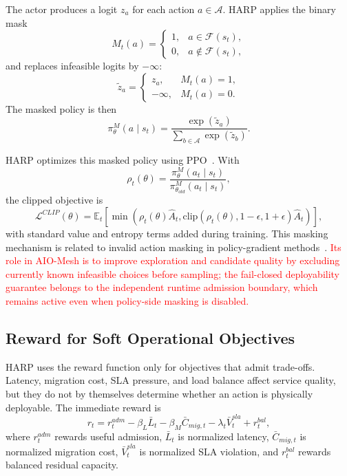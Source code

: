 \documentclass[final,5p]{elsarticle}
\newcommand{\rev}[1]{\textcolor{red}{#1}}
\begin{document}
The actor produces a logit \(z_a\) for each action \(a\in\mathcal{A}\). HARP applies the binary mask
\begin{equation}
    M_t(a)=
    \begin{cases}
        1, & a\in\mathcal{F}(s_t),\\
        0, & a\notin\mathcal{F}(s_t),
    \end{cases}
\end{equation}
and replaces infeasible logits by \(-\infty\):
\begin{equation}
    \tilde{z}_a=
    \begin{cases}
        z_a, & M_t(a)=1,\\
        -\infty, & M_t(a)=0.
    \end{cases}
\end{equation}
The masked policy is then
\begin{equation}
    \pi_\theta^{M}(a\mid s_t)
    =
    \frac{\exp(\tilde{z}_a)}
    {\sum_{b\in\mathcal{A}}\exp(\tilde{z}_b)}.
\end{equation}

HARP optimizes this masked policy using PPO~\cite{schulman2017proximal}. With
\begin{equation}
    \rho_t(\theta)=
    \frac{\pi_\theta^{M}(a_t\mid s_t)}
    {\pi_{\theta_{old}}^{M}(a_t\mid s_t)},
\end{equation}
the clipped objective is
\begin{equation}
    \mathcal{L}^{CLIP}(\theta)
    =
    \mathbb{E}_t
    \left[
    \min
    \left(
    \rho_t(\theta)\hat{A}_t,
    \mathrm{clip}(\rho_t(\theta),1-\epsilon,1+\epsilon)\hat{A}_t
    \right)
    \right],
\end{equation}
with standard value and entropy terms added during training. This masking mechanism is related to invalid action masking in policy-gradient methods~\cite{huang2022closer}. \rev{Its role in AIO-Mesh is to improve exploration and candidate quality by excluding currently known infeasible choices before sampling; the fail-closed deployability guarantee belongs to the independent runtime admission boundary, which remains active even when policy-side masking is disabled.}

\subsection{Reward for Soft Operational Objectives}
\label{subsec:harp_penalty}

HARP uses the reward function only for objectives that admit trade-offs. Latency, migration cost, SLA pressure, and load balance affect service quality, but they do not by themselves determine whether an action is physically deployable. The immediate reward is
\begin{equation}
    r_t
    =
    r_t^{adm}
    -\beta_L \bar{L}_t
    -\beta_M \bar{C}_{mig,t}
    -\lambda_t \bar{V}^{sla}_t
    +r_t^{bal},
    \label{eq:harp_reward}
\end{equation}
where \(r_t^{adm}\) rewards useful admission, \(\bar{L}_t\) is normalized latency, \(\bar{C}_{mig,t}\) is normalized migration cost, \(\bar{V}^{sla}_t\) is normalized SLA violation, and \(r_t^{bal}\) rewards balanced residual capacity.
\end{document}
